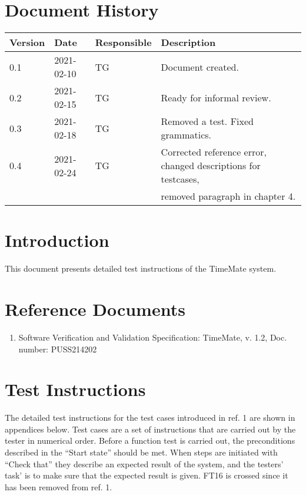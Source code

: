 \documentclass{article}
\date {#1}
\title {
    \documentNumber {03}    
    
    \documentVersion {0.4}
    
    \documentTitle {Software Verification and Validation Instructions}
    \documentGroup {2}
 
    \documentResponsible {Test Group}
    \documentAuthors {Test Group}
    
    \documentDate {2021-02-18}
}
\begin{document}
\maketitle
\thispagestyle{empty}

\newpage

\tableofcontents

\newpage


\section{Document History}
\begin{tabular}{ l | l | l | l }
    Version & Date & Responsible & Description \\
    \hline
   0.1 & 2021-02-10 & TG & Document created. \\
   0.2 & 2021-02-15 & TG & Ready for informal review. \\
    0.3 & 2021-02-18 & TG & Removed a test. Fixed grammatics. \\
    0.4 & 2021-02-24 & TG & Corrected reference error, changed descriptions for testcases,  \\
         &            &   &   removed paragraph in chapter 4. \\
\end{tabular}

\section{Introduction}
This document presents detailed test instructions of the  TimeMate system.

\section{Reference Documents}
\begin{enumerate}
	\item Software Verification and Validation Specification: 	TimeMate, v. 1.2, Doc. number: PUSS214202
\end{enumerate}

\section{Test Instructions}
The detailed test instructions for the test cases introduced in ref. 1 are shown in appendices below. Test cases are a set of instructions that are carried out by the tester in numerical order. Before a function test is carried out, the preconditions described in the “Start state” should be met. When steps are initiated with “Check that” they describe an expected result of the system, and the testers' task' is to make sure that the expected result is given. FT16 is crossed since it has been removed from ref. 1.
\end{document}
